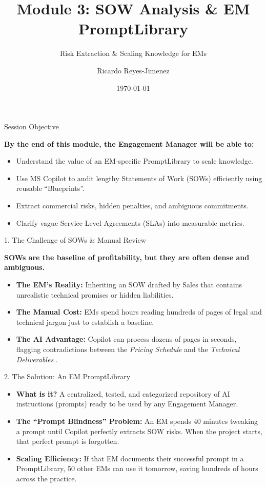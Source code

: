 \documentclass[aspectratio=169]{beamer}
\title[Module 3: SOW Analysis & EM Pr]{Module 3: SOW Analysis & EM PromptLibrary}
\subtitle{Risk Extraction & Scaling Knowledge for EMs}
\author{Ricardo Reyes-Jimenez}
\institute{Capgemini}
\date{\today}
\begin{document}
\begin{frame}
  \titlepage
\end{frame}

\usebackgroundtemplate{}


\begin{frame}{Session Objective}

\textbf{By the end of this module, the Engagement Manager will be able to:}

\begin{itemize}
  \item Understand the value of an EM-specific PromptLibrary to scale knowledge.
  \item Use MS Copilot to audit lengthy Statements of Work (SOWs) efficiently using reusable ``Blueprints''.
  \item Extract commercial risks, hidden penalties, and ambiguous commitments.
  \item Clarify vague Service Level Agreements (SLAs) into measurable  metrics.
\end{itemize}
\end{frame}

\begin{frame}{1. The Challenge of SOWs \& Manual Review}


\textbf{SOWs are the baseline of profitability, but they are often dense and ambiguous.}

\begin{itemize}
  \item \textbf{The EM's Reality:} Inheriting an SOW drafted by Sales that contains unrealistic technical promises or hidden liabilities.
  \item \textbf{The Manual Cost:} EMs spend hours reading hundreds of pages of legal and technical jargon just to establish a baseline.
  \item \textbf{The AI Advantage:} Copilot can process dozens of pages in seconds, flagging contradictions between the \textit{Pricing Schedule} and the \textit{Technical Deliverables} \cite{sowAI2025}.
\end{itemize}
\end{frame}

\begin{frame}{2. The Solution: An EM PromptLibrary}


\begin{itemize}
  \item \textbf{What is it?} A centralized, tested, and categorized repository of AI instructions (prompts) ready to be used by any Engagement Manager.
  \item \textbf{The ``Prompt Blindness'' Problem:} An EM spends 40 minutes tweaking a prompt until Copilot perfectly extracts SOW risks. When the project starts, that perfect prompt is forgotten.
  \item \textbf{Scaling Efficiency:} If that EM documents their successful prompt in a PromptLibrary, 50 other EMs can use it tomorrow, saving hundreds of hours across the practice.
\end{itemize}
\end{frame}
\end{document}
